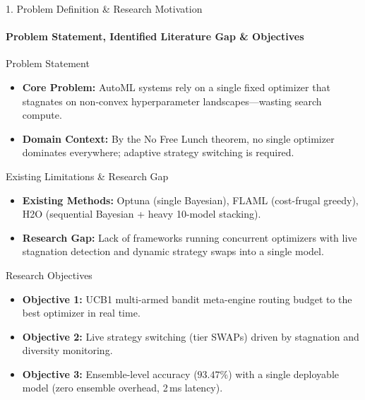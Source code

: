\documentclass[aspectratio=169, 11pt]{beamer}
\begin{document}
\begin{frame}{1. Problem Definition \& Research Motivation}
    \framesubtitle{Problem Statement, Identified Literature Gap \& Objectives}

    \begin{block}{Problem Statement}
        \scriptsize
        \begin{itemize}
            \setlength{\itemsep}{1pt}
            \item \textbf{Core Problem:} AutoML systems rely on a single fixed optimizer that stagnates on non-convex hyperparameter landscapes---wasting search compute.
            \item \textbf{Domain Context:} By the No Free Lunch theorem, no single optimizer dominates everywhere; adaptive strategy switching is required.
        \end{itemize}
    \end{block}

    \begin{block}{Existing Limitations \& Research Gap}
        \scriptsize
        \begin{itemize}
            \setlength{\itemsep}{1pt}
            \item \textbf{Existing Methods:} Optuna (single Bayesian), FLAML (cost-frugal greedy), H2O (sequential Bayesian + heavy 10-model stacking).
            \item \textbf{Research Gap:} Lack of frameworks running concurrent optimizers with live stagnation detection and dynamic strategy swaps into a single model.
        \end{itemize}
    \end{block}

    \begin{block}{Research Objectives}
        \scriptsize
        \begin{itemize}
            \setlength{\itemsep}{1pt}
            \item \textbf{Objective 1:} UCB1 multi-armed bandit meta-engine routing budget to the best optimizer in real time.
            \item \textbf{Objective 2:} Live strategy switching (tier SWAPs) driven by stagnation and diversity monitoring.
            \item \textbf{Objective 3:} Ensemble-level accuracy ($93.47\%$) with a single deployable model (zero ensemble overhead, 2\,ms latency).
        \end{itemize}
    \end{block}
\end{frame}
\end{document}
